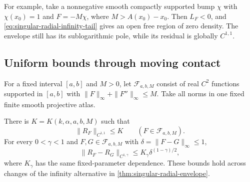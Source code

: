 For example, take a nonnegative smooth compactly supported bump $\chi$ with $\chi(x_0)=1$ and $F=-M\chi$, where $M>A(x_0)-x_0$. Then $L_F<0$, and \eqref{eq:singular-radial-infinity-tail} gives an open free region of zero density. The envelope still has its sublogarithmic pole, while its residual is globally $C^{1,1}$.

\subsection{Uniform bounds through moving contact}
For a fixed interval $[a,b]$ and $M>0$, let $\mathcal F_{a,b,M}$ consist of real $C^2$ functions supported in $[a,b]$ with
$\|F\|_\infty+\|F''\|_\infty\leq M$. Take all norms in one fixed finite smooth projective atlas.

\begin{theorem}\label{thm:singular-radial-uniform-stability}
There is $K=K(k,\alpha,a,b,M)$ such that
\[
 \|R_F\|_{C^{1,1}}\leq K\qquad(F\in\mathcal F_{a,b,M}).
\]
For every $0<\gamma<1$ and $F,G\in\mathcal F_{a,b,M}$ with $\delta=\|F-G\|_\infty\leq1$,
\[
 \|R_F-R_G\|_{C^{1,\gamma}}
 \leq K_\gamma\delta^{(1-\gamma)/2},
\]
where $K_\gamma$ has the same fixed-parameter dependence. These bounds hold across changes of the infinity alternative in \cref{thm:singular-radial-envelope}.
\end{theorem}
